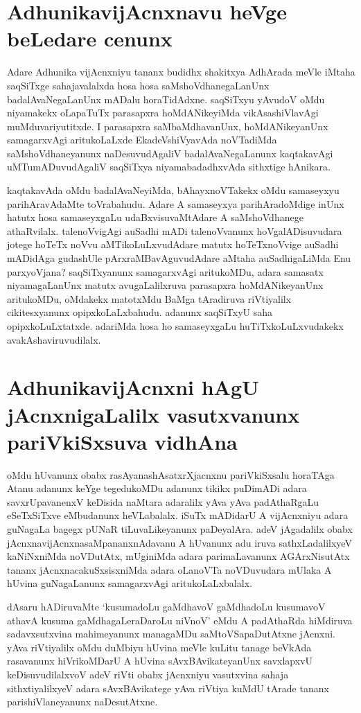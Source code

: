 \section*{AdhunikavijAcnxnavu heVge beLedare cenunx}

Adare Adhunika vijAcnxniyu tananx budidhx shakitxya AdhArada meVle iMtaha saqSiTxge sahajavalalxda hosa hosa saMshoVdhanegaLanUnx badalAvaNegaLanUnx mADalu horaTidAdxne. saqSiTxyu yAvudoV oMdu niyamakekx oLapaTuTx parasapxra hoMdANikeyiMda vikAsashiVlavAgi muMduvariyutitxde. I parasapxra saMbaMdhavanUnx, hoMdANikeyanUnx samagarxvAgi aritukoLaLxde EkadeVshiVyavAda noVTadiMda saMshoVdhaneyanunx naDesuvudAgaliV badalAvaNegaLanunx kaqtakavAgi uMTumADuvudAgaliV saqSiTxya niyamabadadhxvAda sithxtige hAnikara.

kaqtakavAda oMdu badalAvaNeyiMda, bAhayxnoVTakekx oMdu samaseyxyu parihAravAdaMte toVrabahudu. Adare A samaseyxya parihAradoMdige inUnx hatutx hosa samaseyxgaLu udaBxvisuvaMtAdare A saMshoVdhanege athaRvilalx. talenoVvigAgi auSadhi mADi talenoVvanunx hoVgalADisuvudara jotege hoTeTx noVvu aMTikoLuLxvudAdare matutx hoTeTxnoVvige auSadhi mADidAga gudashUle pArxraMBavAguvudAdare aMtaha auSadhigaLiMda Enu parxyoVjana? saqSiTxyanunx samagarxvAgi aritukoMDu, adara samasatx niyamagaLanUnx matutx avugaLalilxruva parasapxra hoMdANikeyanUnx aritukoMDu, oMdakekx matotxMdu BaMga tAradiruva riVtiyalilx cikitesxyanunx opipxkoLaLxbahudu. adanunx saqSiTxyU saha opipxkoLuLxtatxde. adariMda hosa ho samaseyxgaLu huTiTxkoLuLxvudakekx avakAshaviruvudilalx.

\section*{AdhunikavijAcnxni hAgU jAcnxnigaLalilx vasutxvanunx pariVkiSxsuva vidhAna}

oMdu hUvanunx obabx rasAyanashAsatxrXjacnxnu pariVkiSxsalu horaTAga Atanu adanunx keYge tegedukoMDu adanunx tikikx puDimADi adara savxrUpavanenxV keDisida naMtara adaralilx yAva yAva padAthaRgaLu eSeTxSiTxve eMbudanunx heVLabalalx. iSuTx mADidarU A vijAcnxniyu adara guNagaLa bagegx pUNaR tiLuvaLikeyanunx paDeyalAra. adeV jAgadalilx obabx jAcnxnavijAcnxnasaMpananxnAdavanu A hUvanunx adu iruva sathxLadalilxyeV kaNiNxniMda noVDutAtx, mUginiMda adara parimaLavanunx AGArxNisutAtx tananx jAcnxnacakuSxsisxniMda adara oLanoVTa noVDuvudara mUlaka A hUvina guNagaLanunx samagarxvAgi aritukoLaLxbalalx.

dAsaru hADiruvaMte `kusumadoLu gaMdhavoV gaMdhadoLu kusumavoV athavA kusuma gaMdhagaLeraDaroLu niVnoV' eMdu A padAthaRda hiMdiruva sadavxsutxvina mahimeyanunx managaMDu saMtoVSapaDutAtxne jAcnxni. yAva riVtiyalilx oMdu duMbiyu hUvina meVle kuLitu tanage beVkAda rasavanunx hiVrikoMDarU A hUvina sAvxBAvikateyanUnx savxlapxvU keDisuvudilalxvoV adeV riVti obabx jAcnxniyu vasutxvina sahaja sithxtiyalilxyeV adara sAvxBAvikatege yAva riVtiya kuMdU tArade tananx parishiVlaneyanunx naDesutAtxne.

